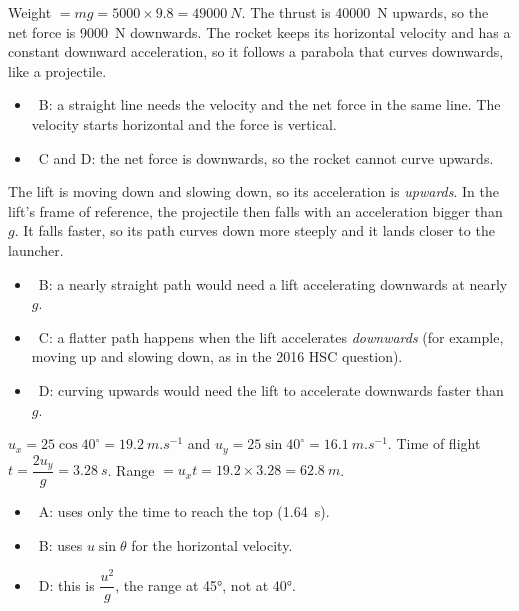 \documentclass[12pt]{article}
\begin{document}
\begin{practiceanswers}
\begin{practiceans}
  Weight $= mg = 5000 \times 9.8 = \qty{49000}{N}$. The thrust is \qty{40000}{N} upwards, so the net
  force is \qty{9000}{N} downwards. The rocket keeps its horizontal velocity and has a constant
  downward acceleration, so it follows a parabola that curves downwards, like a projectile.
  \begin{itemize}
    \item \xmark\ B: a straight line needs the velocity and the net force in the same line. The
          velocity starts horizontal and the force is vertical.
    \item \xmark\ C and D: the net force is downwards, so the rocket cannot curve upwards.
  \end{itemize}
\end{practiceans}

\begin{practiceans}
  The lift is moving down and slowing down, so its acceleration is \emph{upwards}. In the lift's
  frame of reference, the projectile then falls with an acceleration bigger than $g$. It falls
  faster, so its path curves down more steeply and it lands closer to the launcher.
  \begin{itemize}
    \item \xmark\ B: a nearly straight path would need a lift accelerating downwards at nearly $g$.
    \item \xmark\ C: a flatter path happens when the lift accelerates \emph{downwards} (for example,
          moving up and slowing down, as in the 2016 HSC question).
    \item \xmark\ D: curving upwards would need the lift to accelerate downwards faster than $g$.
  \end{itemize}
\end{practiceans}

\begin{practiceans}
  $u_x = 25\cos 40^\circ = \qty{19.2}{m.s^{-1}}$ and $u_y = 25\sin 40^\circ = \qty{16.1}{m.s^{-1}}$.
  Time of flight $t = \dfrac{2u_y}{g} = \qty{3.28}{s}$. Range $= u_x t = 19.2 \times 3.28 = \qty{62.8}{m}$.
  \begin{itemize}
    \item \xmark\ A: uses only the time to reach the top (\qty{1.64}{s}).
    \item \xmark\ B: uses $u\sin\theta$ for the horizontal velocity.
    \item \xmark\ D: this is $\dfrac{u^2}{g}$, the range at \ang{45}, not at \ang{40}.
  \end{itemize}
\end{practiceans}


\end{practiceanswers}
\end{document}

